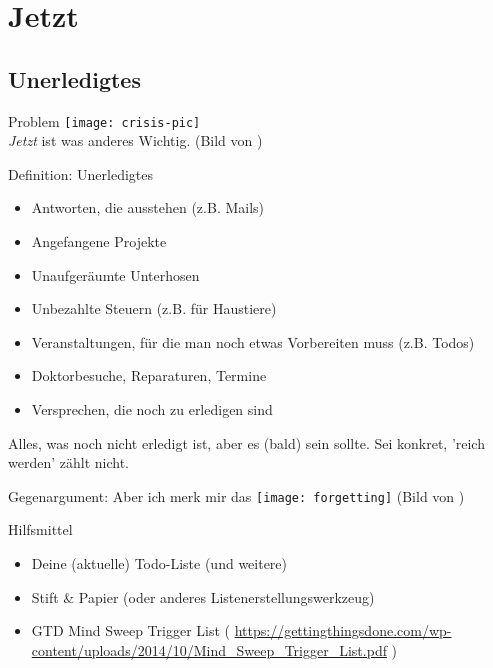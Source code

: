 \section{Jetzt}

\subsection{Unerledigtes}

\begin{frame}[c]{Problem}
    \texttt{[image: crisis-pic]} \\
    {\em Jetzt} ist was anderes Wichtig. (Bild von \cite{crisis-pic})
\end{frame}


\begin{frame}[c]{Definition: Unerledigtes}
    \begin{itemize}[<+(1)->]
        \item Antworten, die ausstehen (z.B. Mails)
        \item Angefangene Projekte
        \item Unaufgeräumte Unterhosen
        \item Unbezahlte Steuern (z.B. für Haustiere)
        \item Veranstaltungen, für die man noch etwas Vorbereiten muss (z.B. Todos)
        \item Doktorbesuche, Reparaturen, Termine
        \item Versprechen, die noch zu erledigen sind
    \end{itemize}
    \pause
    Alles, was noch nicht erledigt ist, aber es (bald) sein
    sollte. Sei konkret, 'reich werden' zählt nicht.
\end{frame}



\begin{frame}[c]{Gegenargument: Aber ich merk mir das}
    \pause
    \texttt{[image: forgetting]}
    (Bild von \cite{forgetting-pic})
\end{frame}


\begin{frame}[c]{Hilfsmittel}
    \Large
    \begin{itemize}[<+(1)->]
        \item Deine (aktuelle) Todo-Liste (und weitere)
        \item Stift \& Papier (oder anderes Listenerstellungswerkzeug)
        \item GTD Mind Sweep Trigger List \cite{trigger-list} ( \url{https://gettingthingsdone.com/wp-content/uploads/2014/10/Mind_Sweep_Trigger_List.pdf} )
    \end{itemize}
\end{frame}

